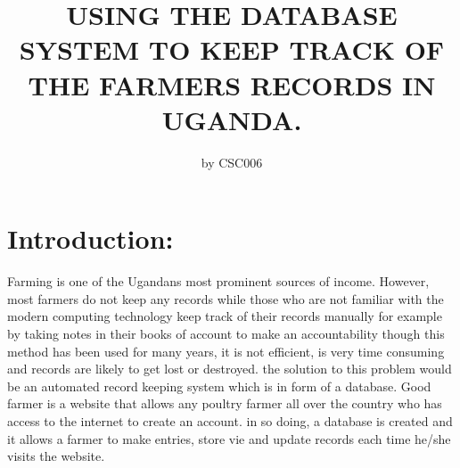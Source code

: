 \documentclass[10pt,letterpaper]{article}
\begin{document}
\title{USING THE DATABASE SYSTEM TO KEEP TRACK OF THE FARMERS RECORDS IN UGANDA.}
\author{by CSC006  }
\maketitle
\section{Introduction:}
Farming is one of the Ugandans most prominent sources of income. However, most farmers do not keep any records while those who are not familiar with the modern computing technology keep track of their records manually for example by taking notes in their books of account to make an accountability though this method has been used for many years, it is not efficient, is very time consuming and records are likely to get lost or destroyed. the solution to this problem would be an automated record keeping system which is in form of a database.
Good farmer is a website that allows any poultry farmer all over the country who has access to the internet to create an account. in so doing, a database is created and it allows a farmer to make entries, store vie and update records each time he/she visits the website. 
\end{document}
